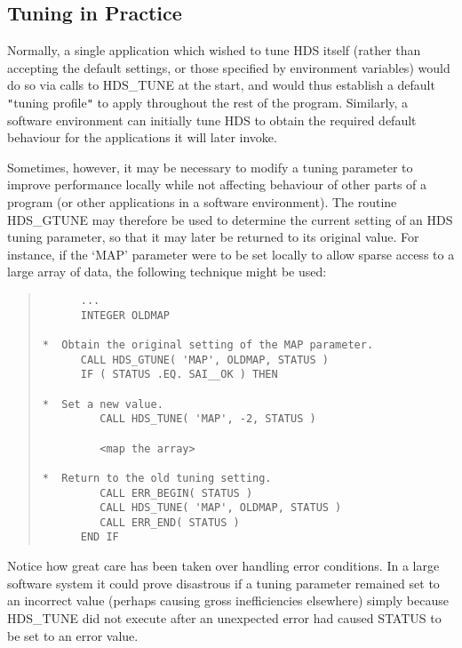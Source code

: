 \documentclass[11pt]{article}
\newcommand{\htmlref}[2]{#1}
\newcommand{\xlabel}[1]{}
\newcommand{\qt}[1]{``#1''}
\renewcommand{\qt}[1]{{\tt{"}}#1{\tt{"}}}
\begin{document}
\subsection{\xlabel{tuning_in_practice}\label{sect:gtune}Tuning in Practice}

Normally, a single application which wished to tune HDS itself (rather
than accepting the default settings, or those specified by environment
variables) would do so via calls to \htmlref{HDS\_TUNE}{HDS_TUNE} at
the start, and would thus establish a default \qt{tuning profile} to
apply throughout the rest of the program.  Similarly, a software
environment can initially tune HDS to obtain the required default
behaviour for the applications it will later invoke.

Sometimes, however, it may be necessary to modify a tuning parameter
to improve performance locally while not affecting behaviour of other
parts of a program (or other applications in a software
environment). The routine \htmlref{HDS\_GTUNE}{HDS_GTUNE} may
therefore be used to determine the current setting of an HDS tuning
parameter, so that it may later be returned to its original value. For
instance, if the `MAP' parameter were to be set locally to allow
sparse access to a large array of data, the following technique might
be used:

\small
\begin{quote}
\begin{verbatim}
      ...
      INTEGER OLDMAP

*  Obtain the original setting of the MAP parameter.
      CALL HDS_GTUNE( 'MAP', OLDMAP, STATUS )
      IF ( STATUS .EQ. SAI__OK ) THEN

*  Set a new value.
         CALL HDS_TUNE( 'MAP', -2, STATUS )

         <map the array>

*  Return to the old tuning setting.
         CALL ERR_BEGIN( STATUS )
         CALL HDS_TUNE( 'MAP', OLDMAP, STATUS )
         CALL ERR_END( STATUS )
      END IF
\end{verbatim}
\end{quote}
\normalsize

Notice how great care has been taken over handling error
conditions. In a large software system it could prove disastrous if a
tuning parameter remained set to an incorrect value (perhaps causing
gross inefficiencies elsewhere) simply because HDS\_TUNE did not
execute after an unexpected error had caused STATUS to be set to an
error value.
\end{document}
